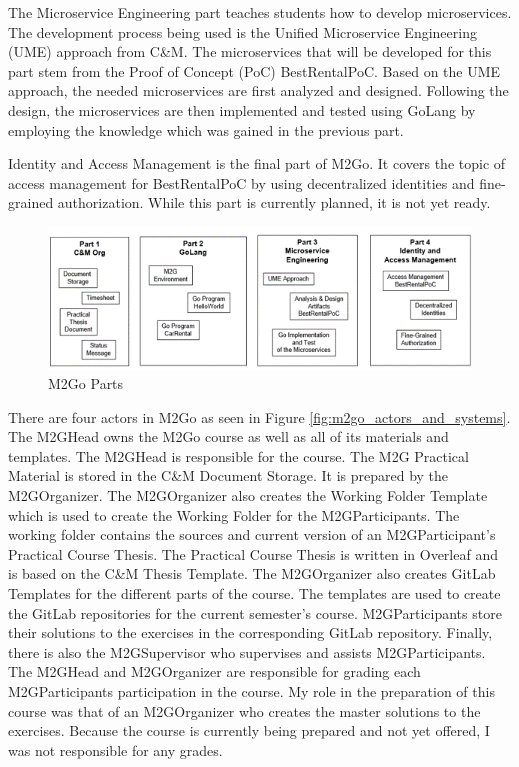 The Microservice Engineering part teaches students how to develop microservices.
The development process being used is the Unified Microservice Engineering (UME) approach from C\&M.
The microservices that will be developed for this part stem from the Proof of Concept (PoC) BestRentalPoC.
Based on the UME approach, the needed microservices are first analyzed and designed.
Following the design, the microservices are then implemented and tested using GoLang by employing
the knowledge which was gained in the previous part.

Identity and Access Management is the final part of M2Go. It covers the topic of access management
for BestRentalPoC by using decentralized identities and fine-grained authorization.
While this part is currently planned, it is not yet ready.

\begin{figure}
	\centering
	\includegraphics[width=\textwidth]{figures/m2go_parts.png}
	\caption{M2Go Parts}
	\label{fig:m2go_parts}
\end{figure}

There are four actors in M2Go as seen in Figure \ref{fig:m2go_actors_and_systems}.
The M2GHead owns the M2Go course as well as all of its materials and templates.
The M2GHead is responsible for the course.
The M2G Practical Material is stored in the C\&M Document Storage.
It is prepared by the M2GOrganizer.
The M2GOrganizer also creates the Working Folder Template which is used to
create the Working Folder for the M2GParticipants. The working folder
contains the sources and current version of an M2GParticipant's Practical Course Thesis.
The Practical Course Thesis is written in Overleaf and is based on the C\&M Thesis Template.
The M2GOrganizer also creates GitLab Templates for the different parts of the course.
The templates are used to create the GitLab repositories for the current semester's course.
M2GParticipants store their solutions to the exercises in the corresponding GitLab repository.
Finally, there is also the M2GSupervisor who supervises and assists M2GParticipants.
The M2GHead and M2GOrganizer are responsible for grading each M2GParticipants participation in the course.
My role in the preparation of this course was that of an M2GOrganizer who creates
the master solutions to the exercises. Because the course is currently being prepared and not
yet offered, I was not responsible for any grades.

